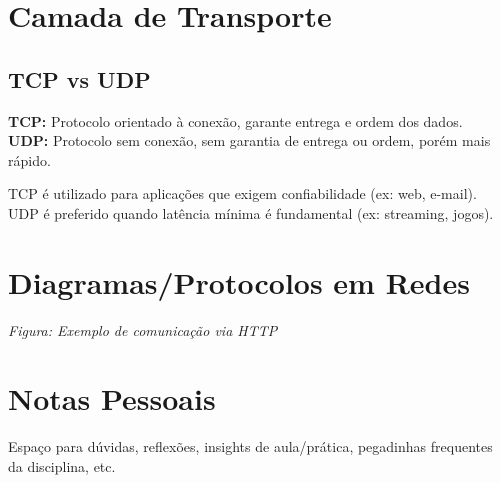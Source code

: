 \section{Camada de Transporte}
\subsection{TCP vs UDP}
\begin{defbox}
\textbf{TCP:} Protocolo orientado à conexão, garante entrega e ordem dos dados.\\
\textbf{UDP:} Protocolo sem conexão, sem garantia de entrega ou ordem, porém mais rápido.
\end{defbox}

\begin{notebox}
TCP é utilizado para aplicações que exigem confiabilidade (ex: web, e-mail). UDP é preferido quando latência mínima é fundamental (ex: streaming, jogos).
\end{notebox}

\section{Diagramas/Protocolos em Redes}
\begin{diagrambox}
\textit{Figura: Exemplo de comunicação via HTTP}
\end{diagrambox}

\section{Notas Pessoais}
Espaço para dúvidas, reflexões, insights de aula/prática, pegadinhas frequentes da disciplina, etc.
